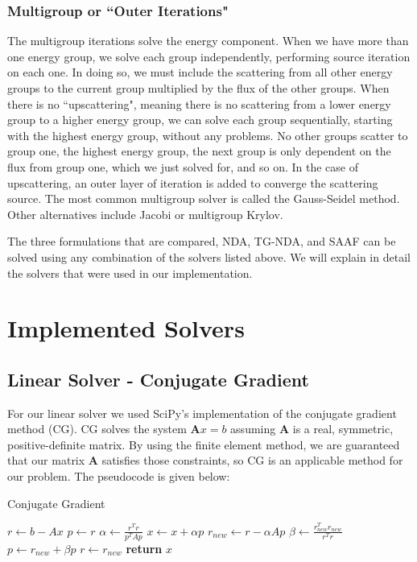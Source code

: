 \subsubsection{Multigroup or ``Outer Iterations"}
The multigroup iterations solve the energy component. When we have more than one energy group, we solve each group independently, performing source iteration on each one. In doing so, we must include the scattering from all other energy groups to the current group multiplied by the flux of the other groups. When there is no ``upscattering", meaning there is no scattering from a lower energy group to a higher energy group, we can solve each group sequentially, starting with the highest energy group, without any problems. No other groups scatter to group one, the highest energy group, the next group is only dependent on the flux from group one, which we just solved for, and so on. In the case of upscattering, an outer layer of iteration is added to converge the scattering source. The most common multigroup solver is called the Gauss-Seidel method. Other alternatives include Jacobi or multigroup Krylov. 

The three formulations that are compared, NDA, TG-NDA, and SAAF can be solved using any combination of the solvers listed above. We will explain in detail the solvers that were used in our implementation. 
\section{Implemented Solvers}
\subsection{Linear Solver - Conjugate Gradient}
For our linear solver we used SciPy's implementation of the conjugate gradient method (CG). CG solves the system $\textbf{A}x = b$ assuming $\textbf{A}$ is a real, symmetric, positive-definite matrix. By using the finite element method, we are guaranteed that our matrix $\textbf{A}$ satisfies those constraints, so CG is an applicable method for our problem.  The pseudocode is given below:
\begin{algorithm}
\caption{Conjugate Gradient}
\begin{algorithmic}
    \State $r \gets b - Ax$
    \State $p \gets r$
        \State $\alpha \gets \frac{r^Tr}{p^TAp}$
        \State $x \gets x + \alpha p$
        \State $r_{new} \gets r - \alpha A p$
        \State $\beta \gets \frac{r_{new}^Tr_{new}}{r^Tr}$
        \State $p \gets r_{new} + \beta p$
        \State $r \gets r_{new}$
    \EndWhile
    \State \textbf{return} $x$  
\end{algorithmic}
\end{algorithm}

